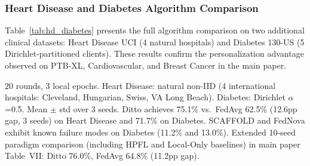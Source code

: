\documentclass[conference]{IEEEtran}
\begin{document}
\subsubsection{Heart Disease and Diabetes Algorithm Comparison}

Table~\ref{tab:hd_diabetes} presents the full algorithm comparison on two additional clinical datasets: Heart Disease UCI (4 natural hospitals) and Diabetes 130-US (5 Dirichlet-partitioned clients). These results confirm the personalization advantage observed on PTB-XL, Cardiovascular, and Breast Cancer in the main paper.

\begin{table}[htbp]
\centering
\caption{FL Algorithm Comparison on Heart Disease and Diabetes}
\label{tab:hd_diabetes}

\vspace{1mm}
\footnotesize{20 rounds, 3 local epochs. Heart Disease: natural non-IID (4 international hospitals: Cleveland, Hungarian, Swiss, VA Long Beach). Diabetes: Dirichlet $\alpha$=0.5. Mean $\pm$ std over 3 seeds. Ditto achieves 75.1\% vs.\ FedAvg 62.5\% (12.6pp gap, 3 seeds) on Heart Disease and 71.7\% on Diabetes. SCAFFOLD and FedNova exhibit known failure modes on Diabetes (11.2\% and 13.0\%). Extended 10-seed paradigm comparison (including HPFL and Local-Only baselines) in main paper Table~VII: Ditto 76.0\%, FedAvg 64.8\% (11.2pp gap).}
\end{table}
\end{document}

